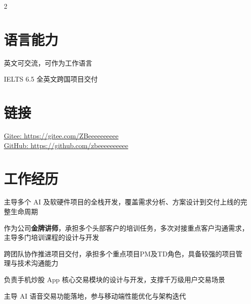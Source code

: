 \documentclass[]{deedy-resume-openfont}
\begin{document}
\begin{paracol}{2}
\sectionsep


\section{语言能力}

英文可交流，可作为工作语言

IELTS 6.5 \textbullet{} 全英文跨国项目交付

\sectionsep


\section{链接}

\href{https://gitee.com/ZBeeeeeeeeee}{Gitee: https://gitee.com/ZBeeeeeeeeee} \\
\href{https://github.com/zbeeeeeeeeee}{GitHub: https://github.com/zbeeeeeeeeee}

%
%
%

\switchcolumn
\raggedright
\color{primary}


\section{工作经历}

\begin{tightemize}
    \item 主导多个 AI 及软硬件项目的全栈开发，覆盖需求分析、方案设计到交付上线的完整生命周期
    \item 作为公司\textbf{金牌讲师}，承担多个头部客户的培训任务，多次对接重点客户沟通需求，主导多门培训课程的设计与开发
    \item 跨团队协作推进项目交付，承担多个重点项目PM及TD角色，具备较强的项目管理与技术沟通能力
\end{tightemize}
\sectionsep

\begin{tightemize}
    \item 负责手机炒股 App 核心交易模块的设计与开发，支撑千万级用户交易场景
    \item 主导 AI 语音交易功能落地，参与移动端性能优化与架构迭代
\end{tightemize}
\sectionsep


\end{paracol}
\end{document}
